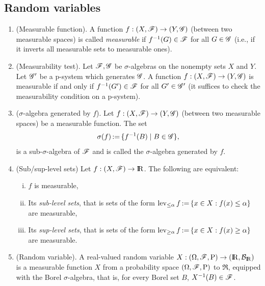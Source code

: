 \documentclass[a4paper,10pt]{article}
\begin{document}
\subsection{Random variables}\label{sec:random_variables}
\begin{enumerate}

 \item (Measurable function). A function $f:(X,\mathscr{F})\to (Y,\mathscr{G})$ (between two measurable spaces) is 
       called \textit{measurable} if $f^{-1}(G) \in \mathscr{F}$ for all $G\in\mathscr{G}$ (i.e., if it inverts all 
       measurable sets to measurable ones).
       
 \item (Measurability test). Let $\mathscr{F},\mathscr{G}$ be $\sigma$-algebras on the nonempty sets $X$ and $Y$. Let $\mathscr{G}'$ be 
       a p-system which generates $\mathscr{G}$. A function $f: (X,\mathscr{F})\to (Y,\mathscr{G})$ is measurable 
       if and only if $f^{-1}(G')\in \mathscr{F}$ for all $G'\in\mathscr{G}'$ (it suffices to check the 
       measurability condition on a p-system).
       
 \item ($\sigma$-algebra generated by $f$). Let $f:(X,\mathscr{F})\to (Y,\mathscr{G})$ (between two measurable spaces) be a measurable
       function. The set 
       \[
        \sigma(f) {}\mathop{\mathrel{:}=}{} \{f^{-1}(B){}\mid{} B\in \mathscr{G}\},
       \]
       is a sub-$\sigma$-algebra of $\mathscr{F}$ and is called the $\sigma$-algebra generated by $f$.
 
 \item (Sub/sup-level sets) Let $f:(X,\F)\to \Re$. The following are equivalent:
      \begin{enumerate}[i.]
       \item $f$ is measurable,
       \item Its \textit{sub-level sets}, that is
       sets of the form $\operatorname{lev}_{\leq \alpha} f {}\mathop{\mathrel{:}=}{} \{x\in X: f(x) \leq \alpha\}$ are measurable,
	\item Its \textit{sup-level sets},
       that is sets of the form $\operatorname{lev}_{ \geq \alpha} f {}\mathop{\mathrel{:}=}{} \{x\in X: f(x) \geq \alpha \}$ are 
       measurable. 
      \end{enumerate}

       
 \item \label{rv220000}
       (Random variable).
       A real-valued random variable $X:\ofp \to (\Re, \B_\Re)$ is a measurable function $X$
       from a probability space $(\Omega,\mathscr{F},\mathrm{P})$ to $\Re$, equipped with the Borel $\sigma$-algebra, that is, 
       for every Borel set $B$, $X^{-1}(B)\in\mathscr{F}$.              
       

\end{enumerate}
\end{document}
